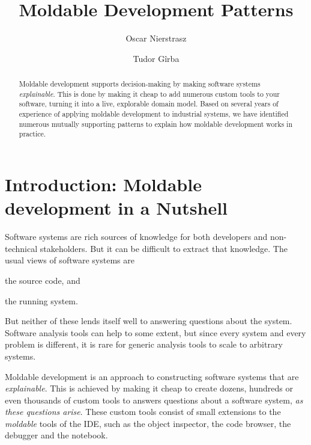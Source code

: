 \documentclass[sigconf]{acmart}
\begin{document}
\title{Moldable Development Patterns}

\author{Oscar Nierstrasz}

\author{Tudor G\^irba}

\renewcommand{\shortauthors}{G\^irba et al.}

\begin{abstract}
Moldable development supports decision-making by making software systems \emph{explainable}.
This is done by making it cheap to add numerous custom tools to your software, turning it into a live, explorable domain model.
Based on several years of experience of applying moldable development to industrial systems, we have identified numerous mutually supporting patterns to explain how moldable development works in practice.
\end{abstract}


\maketitle

\section{Introduction: Moldable development in a Nutshell}

Software systems are rich sources of knowledge for both developers and non-technical stakeholders.
But it can be difficult to extract that knowledge.
The usual views of software systems are
\begin{inparaenum}[(i)]
\item the source code, and
\item the running system.
\end{inparaenum}
But neither of these lends itself well to answering questions about the system.
Software analysis tools can help to some extent, but since every system and every problem is different, it is rare for generic analysis tools to scale to arbitrary systems.

Moldable development is an approach to constructing software systems that are \emph{explainable}.
This is achieved by making it cheap to create dozens, hundreds or even thousands of custom tools to answers questions about a software system, \emph{as these questions arise}.
These custom tools consist of small extensions to the \emph{moldable} tools of the IDE, such as the object inspector, the code browser, the debugger and the notebook.
\end{document}
